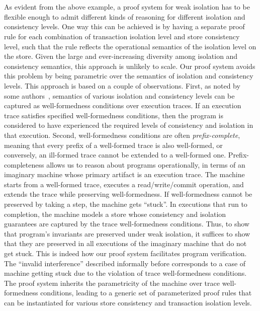 \section{\txnimp}



As evident from the above example, a proof system for weak isolation
has to be flexible enough to admit different kinds of reasoning for
different isolation and consistency levels. One way this can be
achieved is by having a separate proof rule for each combination of
transaction isolation level and store consistency level, such that the
rule reflects the operational semantics of the isolation level on the
store. Given the large and ever-increasing diversity among isolation
and consistency semantics, this approach is unlikely to scale. Our
proof system avoids this problem by being parametric over the
semantics of isolation and consistency levels. This approach is based
on a couple of observations. First, as noted by some
authors~\cite{pldi15,gotsmanconcur15}, semantics of various isolation
and consistency levels can be captured as well-formedness conditions
over execution traces. If an execution trace satisfies specified
well-formedness conditions, then the program is considered to have
experienced the required levels of consistency and isolation in that
execution. Second, well-formedness conditions are often
\emph{prefix-complete}, meaning that every prefix of a well-formed
trace is also well-formed, or conversely, an ill-formed trace cannot
be extended to a well-formed one. Prefix-completeness allows us to
reason about programs operationally, in terms of an imaginary machine
whose primary artifact is an execution trace. The machine starts from
a well-formed trace, executes a read/write/commit operation, and
extends the trace while preserving well-formedness. If well-formedness
cannot be preserved by taking a step, the machine gets ``stuck''. In
executions that run to completion, the machine models a store whose
consistency and isolation guarantees are captured by the trace
well-formedness conditions. Thus, to show that program's invariants
are preserved under weak isolation, it suffices to show that they are
preserved in all executions of the imaginary machine that do not get
stuck. This is indeed how our proof system facilitates program
verification. The ``invalid interference'' described informally before
corresponds to a case of machine getting stuck due to the violation of
trace well-formedness conditions. The proof system inherits the
parametricity of the machine over trace well-formedness conditions,
leading to a generic set of parameterized proof rules that can be
instantiated for various store consistency and transaction isolation
levels.


